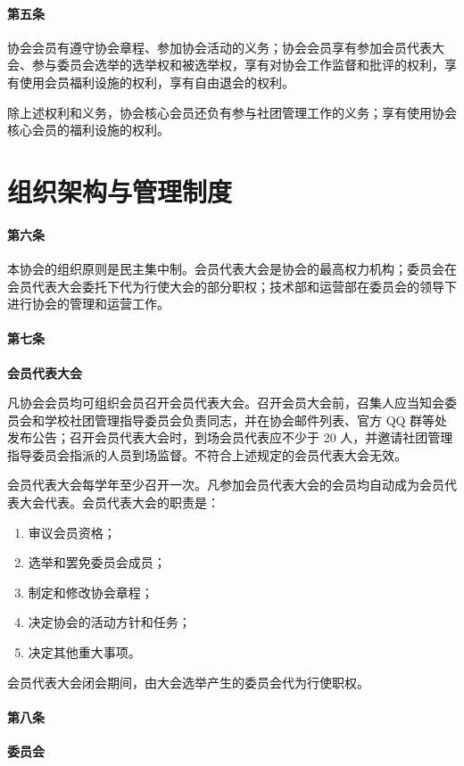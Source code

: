 \documentclass[a4paper, 12pt, twoside]{ctexart}
\begin{document}
	\paragraph{第五条} 协会会员有遵守协会章程、参加协会活动的义务；协会会员享有参加会员代表大会、参与委员会选举的选举权和被选举权，享有对协会工作监督和批评的权利，享有使用会员福利设施的权利，享有自由退会的权利。
	
	除上述权利和义务，协会核心会员还负有参与社团管理工作的义务；享有使用协会核心会员的福利设施的权利。
	
	\section{组织架构与管理制度}
	
	\paragraph{第六条} 本协会的组织原则是民主集中制。会员代表大会是协会的最高权力机构；委员会在会员代表大会委托下代为行使大会的部分职权；技术部和运营部在委员会的领导下进行协会的管理和运营工作。
	
	\paragraph{第七条} \textbf{会员代表大会}
	
	凡协会会员均可组织会员召开会员代表大会。召开会员大会前，召集人应当知会委员会和学校社团管理指导委员会负责同志，并在协会邮件列表、官方 QQ 群等处发布公告；召开会员代表大会时，到场会员代表应不少于 20 人，并邀请社团管理指导委员会指派的人员到场监督。不符合上述规定的会员代表大会无效。
	
	会员代表大会每学年至少召开一次。凡参加会员代表大会的会员均自动成为会员代表大会代表。会员代表大会的职责是：
	
	\begin{enumerate}
		\item 审议会员资格；
		\item 选举和罢免委员会成员；
		\item 制定和修改协会章程；
		\item 决定协会的活动方针和任务；
		\item 决定其他重大事项。
	\end{enumerate}
	
	会员代表大会闭会期间，由大会选举产生的委员会代为行使职权。
	
	\paragraph{第八条} \textbf{委员会}
	
\end{document}
